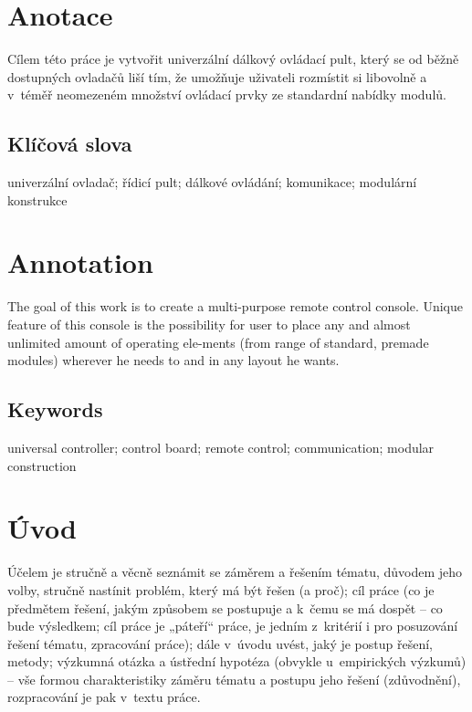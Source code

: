 \documentclass{template/socthesis}
\author{Jan Novák}
\begin{document}
\maketitle

\makecopyrightstatement


\pagestyle{empty}

\section*{Anotace}
Cílem této práce je vytvořit univerzální dálkový ovládací pult, který se od běžně dostupných ovladačů liší tím, že umožňuje uživateli rozmístit si libovolně a v~téměř neomezeném množství ovládací prvky ze standardní nabídky modulů.

\subsection*{Klíčová slova}
univerzální ovladač; řídicí pult; dálkové ovládání; komunikace; modulární konstrukce

\vspace{20mm}

\section*{Annotation}
The goal of this work is to create a multi-purpose remote control console. Unique feature of this console is the possibility for user to place any and almost unlimited amount of operating ele-ments (from range of standard, premade modules) wherever he needs to and in any layout he wants.

\subsection*{Keywords}
universal controller; control board; remote control; communication; modular construction 

\newpage
\pagestyle{plain}

\tableofcontents %

\setcounter{figure}{0}
\setcounter{table}{0}
\newpage

\section*{Úvod}
Účelem je stručně a věcně seznámit se záměrem a řešením tématu, důvodem jeho volby, stručně nastínit problém, který má být řešen (a proč); cíl práce (co je předmětem řešení, jakým způsobem se postupuje a k~čemu se má dospět -- co bude výsledkem; cíl práce je „páteří“ práce, je jedním z~kritérií i pro posuzování řešení tématu, zpracování práce); dále v~úvodu uvést, jaký je postup řešení, metody; výzkumná otázka a ústřední hypotéza (obvykle u~empirických výzkumů) -- vše formou charakteristiky záměru tématu a postupu jeho řešení (zdůvodnění), rozpracování je pak v~textu práce.
\end{document}

